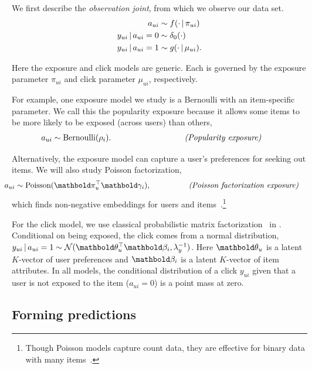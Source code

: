 We first describe the \textit{observation joint}, from which we
observe our data set.
\begin{align*}
  a_{ui} & \sim f(\cdot \,\vert\, \pi_{ui}) \\
  y_{ui} \,\vert\, a_{ui}=0 & \sim \delta_{0}(\cdot) \\
  y_{ui} \,\vert\, a_{ui}=1 & \sim g(\cdot \,\vert\, \mu_{ui}).
\end{align*}

Here the exposure and click models are generic.  Each is governed by
the exposure parameter $\pi_{ui}$ and click parameter $\mu_{ui}$,
respectively.

For example, one exposure model we study is a Bernoulli with an
item-specific parameter.  We call this the popularity exposure because
it allows some items to be more likely to be exposed (across users)
than others,
\begin{align}
\kern-1em a_{ui} &\sim \mathrm{Bernoulli}(\rho_i). & \qquad\qquad\qquad\qquad\textit{(Popularity exposure)} &
  \label{eq:popularity}
\end{align}

Alternatively, the exposure model can capture a user's preferences for
seeking out items.  We will also study Poisson factorization,
\begin{align}
  \kern-1em a_{ui} &\sim \textrm{Poisson}(\mb\pi_u^\top \mb\gamma_i),
  & \qquad\qquad\textit{(Poisson factorization exposure)}&
  \label{eq:poisson-factorization}
\end{align} which finds
non-negative embeddings for users and
items~\citep{Gopalan:2015}.\footnote{Though Poisson models capture
  count data, they are effective for binary data with many
  items~\citep{Gopalan:2015}.}

For the click model, we use classical probabilistic matrix
factorization~\citep{salakhutdinov2008probabilistic} in . Conditional on being
exposed, the click comes from a normal distribution,
$y_{ui} \g a_{ui} = 1 \sim \cN(\mb\theta_u^\top \mb\beta_i,
\lambda_y^{-1})$.
Here $\mb\theta_u$ is a latent $K$-vector of user preferences and
$\mb\beta_i$ is a latent $K$-vector of item attributes. In all models,
the conditional distribution of a click $y_{ui}$ given that a user is
not exposed to the item ($a_{ui} = 0$) is a point mass at zero.


\subsection{Forming predictions}  

